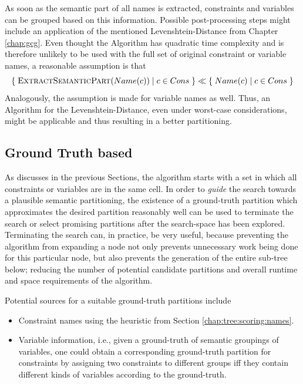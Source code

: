 			As soon as the semantic part of all names is extracted, constraints and variables can be grouped based on this information.
			Possible post-processing steps might include an application of the mentioned Levenshtein-Distance from Chapter \ref{chap:gcg}.
			Even thought the Algorithm has quadratic time complexity and is therefore unlikely to be used with the full set of original constraint or variable names, a reasonable assumption is that
			\begin{equation*}
				\{ \; \Call{ExtractSemanticPart}{Name(c)} \mid c \in Cons \; \} \ll \{ \; Name(c) \mid c \in Cons \; \}
			\end{equation*}
			Analogously, the assumption is made for variable names as well.
			Thus, an Algorithm for the Levenshtein-Distance, even under worst-case considerations, might be applicable and thus resulting in a better partitioning.
			
			\clearpage
			

		\subsection{Ground Truth based}
		\label{chap:tree:scoring:groundtruth}
		
			As discusses in the previous Sections, the algorithm starts with a set in which all constraints or variables are in the same cell.
			In order to \textit{guide} the search towards a plausible semantic partitioning, the existence of a ground-truth partition which approximates the desired partition reasonably well can be used to terminate the search or select promising partitions after the search-space has been explored.
			Terminating the search can, in practice, be very useful, because preventing the algorithm from expanding a node not only prevents unnecessary work being done for this particular node, but also prevents the generation of the entire sub-tree below; reducing the number of potential candidate partitions and overall runtime and space requirements of the algorithm.
			
			Potential sources for a suitable ground-truth partitions include
			\begin{itemize}
				\item Constraint names using the heuristic from Section \ref{chap:tree:scoring:names}. 
				\item Variable information, i.e., given a ground-truth of semantic groupings of variables, one could obtain a corresponding ground-truth partition for constraints by assigning two constraints to different groups iff they contain different kinds of variables according to the ground-truth.
			\end{itemize}
			

